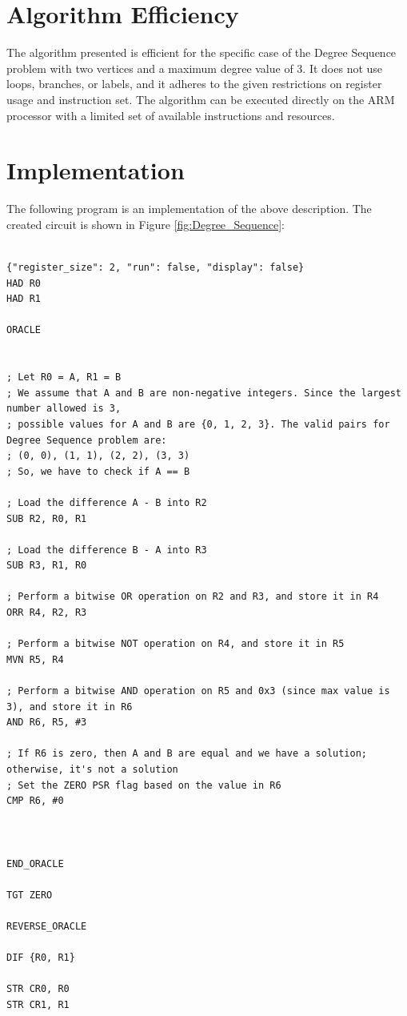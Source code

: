 \section{Algorithm Efficiency}
The algorithm presented is efficient for the specific case of the Degree Sequence problem with two vertices and a maximum degree value of 3. It does not use loops, branches, or labels, and it adheres to the given restrictions on register usage and instruction set. The algorithm can be executed directly on the ARM processor with a limited set of available instructions and resources.



\section{Implementation}

The following program is an implementation of the above description. The created circuit is shown in Figure \ref{fig:Degree_Sequence}:

\begin{lstlisting}

{"register_size": 2, "run": false, "display": false}
HAD R0
HAD R1

ORACLE


; Let R0 = A, R1 = B
; We assume that A and B are non-negative integers. Since the largest number allowed is 3,
; possible values for A and B are {0, 1, 2, 3}. The valid pairs for Degree Sequence problem are:
; (0, 0), (1, 1), (2, 2), (3, 3)
; So, we have to check if A == B

; Load the difference A - B into R2
SUB R2, R0, R1

; Load the difference B - A into R3
SUB R3, R1, R0

; Perform a bitwise OR operation on R2 and R3, and store it in R4
ORR R4, R2, R3

; Perform a bitwise NOT operation on R4, and store it in R5
MVN R5, R4

; Perform a bitwise AND operation on R5 and 0x3 (since max value is 3), and store it in R6
AND R6, R5, #3

; If R6 is zero, then A and B are equal and we have a solution; otherwise, it's not a solution
; Set the ZERO PSR flag based on the value in R6
CMP R6, #0



END_ORACLE

TGT ZERO

REVERSE_ORACLE

DIF {R0, R1}

STR CR0, R0
STR CR1, R1


\end{lstlisting}

